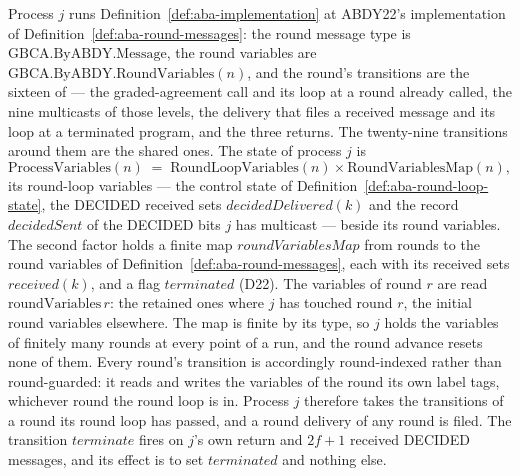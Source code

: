 \begin{definition}
  \label{def:aba-programs}
  \leanok
  Process $j$ runs Definition~\ref{def:aba-implementation} at ABDY22's implementation of Definition~\ref{def:aba-round-messages}: the round message type is $\mathrm{GBCA.ByABDY.Message}$, the round variables are $\mathrm{GBCA.ByABDY.RoundVariables}(n)$, and the round's transitions are the sixteen of  --- the graded-agreement call and its loop at a round already called, the nine multicasts of those levels, the delivery that files a received message and its loop at a terminated program, and the three returns.
  The twenty-nine transitions around them are the shared ones.
  The state of process $j$ is
  \[
    \mathrm{ProcessVariables}(n) \;=\;
      \mathrm{RoundLoopVariables}(n) \times \mathrm{RoundVariablesMap}(n),
  \]
  its round-loop variables --- the control state of Definition~\ref{def:aba-round-loop-state}, the DECIDED received sets $decidedDelivered(k)$ and the record $decidedSent$ of the DECIDED bits $j$ has multicast --- beside its round variables.
  The second factor holds a finite map $roundVariablesMap$ from rounds to the round variables of Definition~\ref{def:aba-round-messages}, each with its received sets $received(k)$, and a flag $terminated$ (D22).
  The variables of round $r$ are read $\mathrm{roundVariables}\,r$: the retained ones where $j$ has touched round $r$, the initial round variables elsewhere.
  The map is finite by its type, so $j$ holds the variables of finitely many rounds at every point of a run, and the round advance resets none of them.
  Every round's transition is accordingly round-indexed rather than round-guarded: it reads and writes the variables of the round its own label tags, whichever round the round loop is in.
  Process $j$ therefore takes the transitions of a round its round loop has passed, and a round delivery of any round is filed.
  The transition $terminate$ fires on $j$'s own return and $2f+1$ received DECIDED messages, and its effect is to set $terminated$ and nothing else.

\end{definition}
